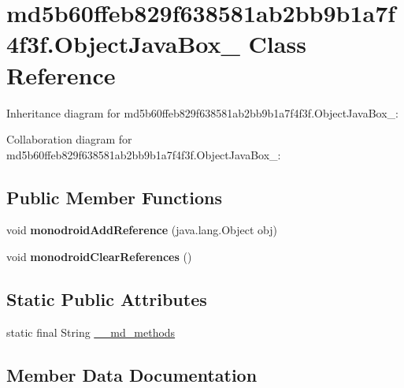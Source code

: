 \hypertarget{classmd5b60ffeb829f638581ab2bb9b1a7f4f3f_1_1_object_java_box__1}{}\section{md5b60ffeb829f638581ab2bb9b1a7f4f3f.\+Object\+Java\+Box\+\_ Class Reference}
\label{classmd5b60ffeb829f638581ab2bb9b1a7f4f3f_1_1_object_java_box__1}


Inheritance diagram for md5b60ffeb829f638581ab2bb9b1a7f4f3f.\+Object\+Java\+Box\+\_\+:


Collaboration diagram for md5b60ffeb829f638581ab2bb9b1a7f4f3f.\+Object\+Java\+Box\+\_\+:
\subsection*{Public Member Functions}
\begin{DoxyCompactItemize}
\item 
\mbox{\label{classmd5b60ffeb829f638581ab2bb9b1a7f4f3f_1_1_object_java_box__1_af2bae9bb53179373bfbbef8b7fa568b1}} 
void {\bfseries monodroid\+Add\+Reference} (java.\+lang.\+Object obj)
\item 
\mbox{\label{classmd5b60ffeb829f638581ab2bb9b1a7f4f3f_1_1_object_java_box__1_a4218e4072c05c7d03d73208e68933721}} 
void {\bfseries monodroid\+Clear\+References} ()
\end{DoxyCompactItemize}
\subsection*{Static Public Attributes}
\begin{DoxyCompactItemize}
\item 
static final String \hyperlink{classmd5b60ffeb829f638581ab2bb9b1a7f4f3f_1_1_object_java_box__1_a71c23a08d05ad66171fa5a28f857587d}{\+\_\+\+\_\+md\+\_\+methods}
\end{DoxyCompactItemize}


\subsection{Member Data Documentation}
\mbox{\label{classmd5b60ffeb829f638581ab2bb9b1a7f4f3f_1_1_object_java_box__1_a71c23a08d05ad66171fa5a28f857587d}} 
